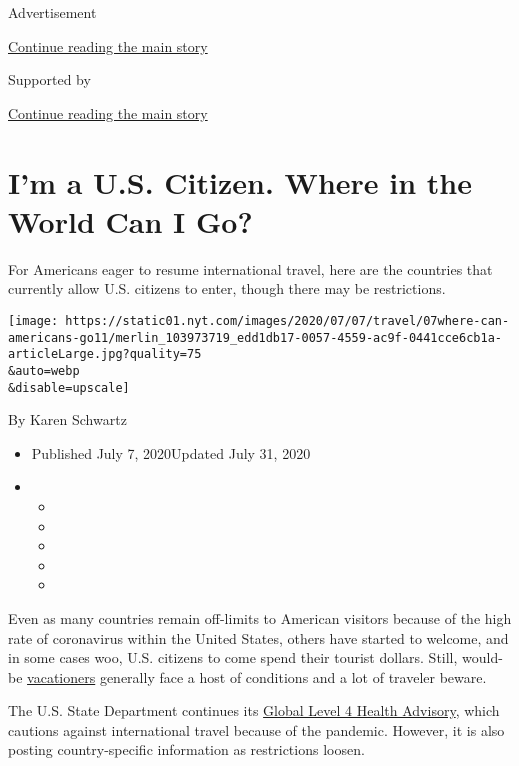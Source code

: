 Advertisement

\protect\hyperlink{after-top}{Continue reading the main story}

Supported by

\protect\hyperlink{after-sponsor}{Continue reading the main story}

\hypertarget{im-a-us-citizen-where-in-the-world-can-i-go}{%
\section{I'm a U.S. Citizen. Where in the World Can I
Go?}\label{im-a-us-citizen-where-in-the-world-can-i-go}}

For Americans eager to resume international travel, here are the
countries that currently allow U.S. citizens to enter, though there may
be restrictions.

\texttt{[image: https://static01.nyt.com/images/2020/07/07/travel/07where-can-americans-go11/merlin\_103973719\_edd1db17-0057-4559-ac9f-0441cce6cb1a-articleLarge.jpg?quality=75\\\&auto=webp\\\&disable=upscale]}

By Karen Schwartz

\begin{itemize}
\item
  Published July 7, 2020Updated July 31, 2020
\item
  \begin{itemize}
  \item
  \item
  \item
  \item
  \item
  \end{itemize}
\end{itemize}

Even as many countries remain off-limits to American visitors because of
the high rate of coronavirus within the United States, others have
started to welcome, and in some cases woo, U.S. citizens to come spend
their tourist dollars. Still, would-be
\href{https://www.nytimes.com/2020/07/16/travel/virus-vacation.html}{vacationers}
generally face a host of conditions and a lot of traveler beware.

The U.S. State Department continues its
\href{https://travel.state.gov/content/travel/en/traveladvisories/COVID-19-Country-Specific-Information.html}{Global
Level 4 Health Advisory}, which cautions against international travel
because of the pandemic. However, it is also posting country-specific
information as restrictions loosen.

